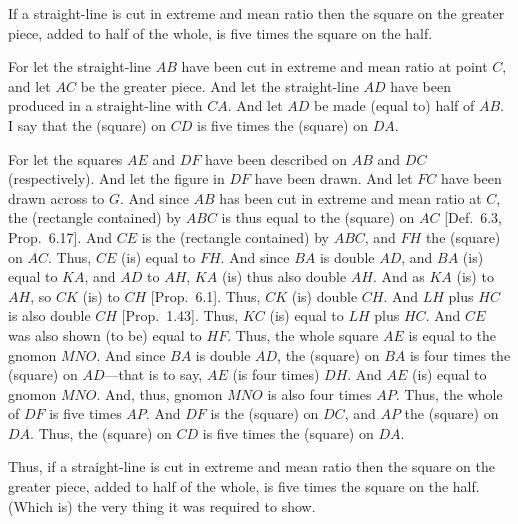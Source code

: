 \begin{Parallel}{}{}
{If a straight-line is cut in extreme and mean ratio then the square on the
greater piece, added to half of the whole, is  five times the square
on the half.

\epsfysize=2.5in
\centerline{}

For let the straight-line $AB$ have been cut in extreme and mean ratio at
point $C$, and let $AC$ be the greater piece. And let the straight-line
$AD$ have been produced in a straight-line with $CA$. And let
$AD$ be made (equal to) half of $AB$. I say that the (square) on
$CD$ is five times the (square) on $DA$. 

For let the squares $AE$ and $DF$ have been described on $AB$ and
$DC$ (respectively). And let the figure in $DF$ have been drawn.  
And let $FC$ have been drawn across to $G$. And since $AB$ has been
cut in extreme and mean ratio at $C$, the (rectangle
contained) by $ABC$ is thus equal to the (square) on $AC$ [Def.~6.3, Prop.~6.17].
And  $CE$ is the (rectangle contained) by $ABC$, and $FH$ the
(square) on $AC$. Thus, $CE$ (is) equal to $FH$. 
And since $BA$ is double $AD$, and $BA$ (is) equal to $KA$,
and $AD$ to $AH$, $KA$ (is) thus also double $AH$. 
And as $KA$ (is) to $AH$, so $CK$ (is) to $CH$ [Prop.~6.1].
Thus, $CK$ (is) double $CH$. And $LH$ plus $HC$ is also double $CH$
[Prop.~1.43].  Thus, $KC$ (is) equal to $LH$ plus $HC$. And
$CE$ was also shown (to be) equal to $HF$. Thus, the whole square
$AE$ is equal to the gnomon $MNO$. And since $BA$ is double
$AD$, the (square) on $BA$ is four times the (square) on $AD$---that
is to say, $AE$ (is four times) $DH$. And $AE$ (is) equal to
gnomon $MNO$. And, thus, gnomon $MNO$ is also four times $AP$. 
Thus, the whole of $DF$ is five times $AP$. And $DF$ is the (square)
on $DC$, and $AP$ the (square) on $DA$. Thus, the
(square) on $CD$ is five times the (square) on $DA$. 

Thus, if a straight-line is cut in extreme and mean ratio then the square on the
greater piece, added to half of the whole, is five times the square
on the half. (Which is) the very thing it was required to show.}
\end{Parallel}

